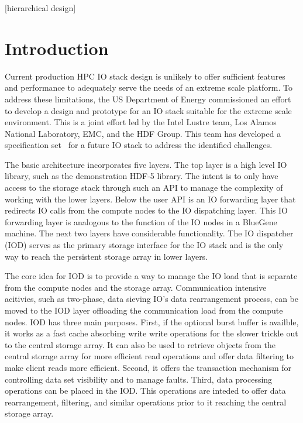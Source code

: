 \documentclass[conference]{sig-alt-gov2}
\begin{document}
[hierarchical design]


\section{Introduction}

Current production HPC IO stack design is unlikely to offer sufficient features
and performance to adequately serve the needs of an extreme scale platform. To
address these limitations, the US Department of Energy commissioned an effort
to develop a design and prototype for an IO stack suitable for the extreme
scale environment. This is a joint effort led by the Intel Lustre team, Los
Alamos National Laboratory, EMC, and the HDF Group. This team has developed a
specification set~\cite{fastforward:2014:docs} for a future IO stack to address
the identified challenges.

The basic architecture incorporates five layers. The top layer is a high level
IO library, such as the demonstration HDF-5 library. The intent is to only have
access to the storage stack through such an API to manage the complexity of
working with the lower layers. Below the user API is an IO forwarding layer
that redirects IO calls from the compute nodes to the IO dispatching layer.
This IO forwarding layer is analogous to the function of the IO nodes in a
BlueGene machine. The next two layers have considerable functionality. The IO
dispatcher (IOD) serves as the primary storage interface for the IO stack and
is the only way to reach the persistent storage array in lower layers.

The core idea for IOD is to provide a way to manage the IO load that is
separate from the compute nodes and the storage array. Communication intensive
acitivies, such as two-phase, data sieving IO's data rearrangement process, can
be moved to the IOD layer offloading the communication load from the compute
nodes. IOD has three main purposes. First, if the optional burst buffer is
availble, it works as a fast cache absorbing write write operations for the
slower trickle out to the central storage array. It can also be used to
retrieve objects from the central storage array for more efficient read
operations and offer data filtering to make client reads more efficient.
Second, it offers the transaction mechanism for controlling data set visibility
and to manage faults. Third, data processing operations can be placed in the
IOD. This operations are inteded to offer data rearrangement, filtering, and
similar operations prior to it reaching the central storage array.
\end{document}
